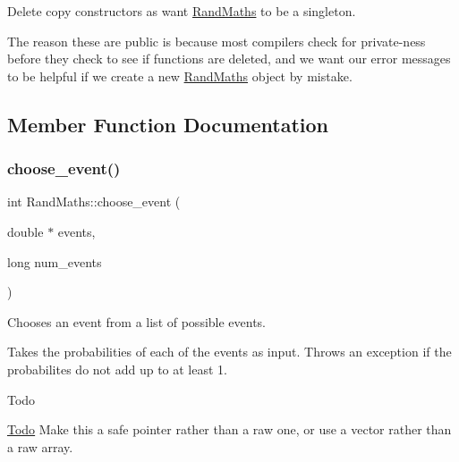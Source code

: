 Delete copy constructors as want \mbox{\hyperlink{classrcombinator_1_1RandMaths}{Rand\+Maths}} to be a singleton. 

The reason these are public is because most compilers check for private-\/ness before they check to see if functions are deleted, and we want our error messages to be helpful if we create a new \mbox{\hyperlink{classrcombinator_1_1RandMaths}{Rand\+Maths}} object by mistake. 

\subsection{Member Function Documentation}
\mbox{\label{classrcombinator_1_1RandMaths_afbc0d35bd9744ecab1983914ac32d68c}} 
\subsubsection{\texorpdfstring{choose\+\_\+event()}{choose\_event()}}
{\footnotesize\ttfamily int Rand\+Maths\+::choose\+\_\+event (\begin{DoxyParamCaption}\item[{double $\ast$}]{events,  }\item[{long}]{num\+\_\+events }\end{DoxyParamCaption})}



Chooses an event from a list of possible events. 

Takes the probabilities of each of the events as input. Throws an exception if the probabilites do not add up to at least 1.

\begin{DoxyRefDesc}{Todo}
\item[\mbox{\hyperlink{todo__todo000008}{Todo}}]Make this a safe pointer rather than a raw one, or use a vector rather than a raw array.\end{DoxyRefDesc}


